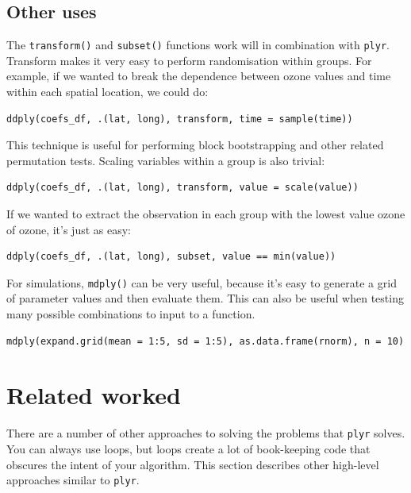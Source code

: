 \documentclass{scrartcl}
\newcommand{\f}[1]{\lstinline!#1()!}
\newcommand{\plyr}{{\tt plyr}\xspace}
\begin{document}
\subsection{Other uses}

The \f{transform} and \f{subset} functions work will in combination with \plyr.  Transform makes it very easy to perform randomisation within groups.  For example, if we wanted to break the dependence between ozone values and time within each spatial location, we could do:

\begin{verbatim}
ddply(coefs_df, .(lat, long), transform, time = sample(time))  
\end{verbatim}

\noident This technique is useful for performing block bootstrapping and other related permutation tests.  Scaling variables within a group is also trivial:

\begin{verbatim}
ddply(coefs_df, .(lat, long), transform, value = scale(value))  
\end{verbatim}

If we wanted to extract the observation in each group with the lowest value ozone of ozone, it's just as easy:

\begin{verbatim}
ddply(coefs_df, .(lat, long), subset, value == min(value))  
\end{verbatim}

\noindent 

For simulations, \f{mdply} can be very useful, because it's easy to generate a grid of parameter values and then evaluate them.  This can also be useful when testing many possible combinations to input to a function.

\begin{verbatim}
mdply(expand.grid(mean = 1:5, sd = 1:5), as.data.frame(rnorm), n = 10)
\end{verbatim}

\section{Related worked}
\label{sec:equiv}

There are a number of other approaches to solving the problems that \plyr solves.  You can always use loops, but loops create a lot of book-keeping code that obscures the intent of your algorithm.  This section describes other high-level approaches similar to \plyr.
\end{document}
